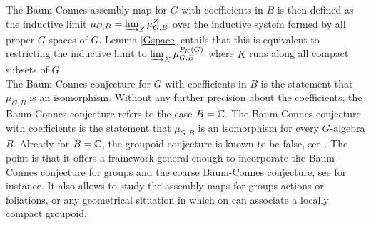 The Baum-Connes assembly map for $G$ with coefficients in $B$ is then defined as the inductive limit $\mu_{G,B} = \varinjlim_Z \mu^Z_{G,B}$ over the inductive system formed by all proper $G$-spaces of $G$. Lemma \ref{Gspace} entails that this is equivalent to restricting the inductive limit to $\varinjlim_K \mu^{P_K(G)}_{G,B}$ where $K$ runs along all compact subsets of $G$.\\

The Baum-Connes conjecture for $G$ with coefficients in $B$ is the statement that $\mu_{G,B}$ is an isomorphism. Without any further precision about the coefficients, the Baum-Connes conjecture refers to the case $B=\mathbb C$. The Baum-Connes conjecture with coefficients is the statement that $\mu_{G,B}$ is an isomorphism for every $G$-algebra $B$. Already for $B=\mathbb C$, the groupoid conjecture is known to be false, see \cite{HigsonLaffSk}. The point is that it offers a framework general enough to incorporate the Baum-Connes conjecture for groups and the coarse Baum-Connes conjecture, see \cite{SkTuYu} for instance. It also allows to study the assembly maps for groups actions or foliations, or any geometrical situation in which on can associate a locally compact groupoid.		 





















